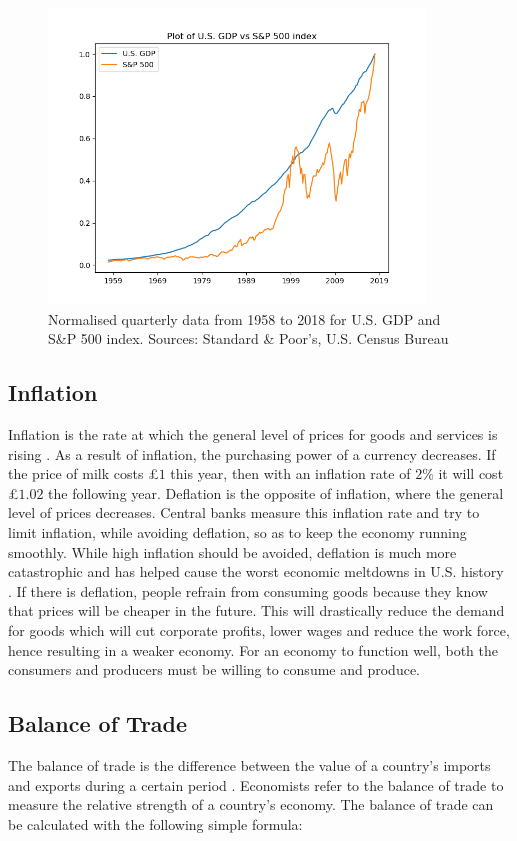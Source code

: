 \documentclass{UoYCSproject}
\begin{document}
\begin{figure}[h]
\includegraphics[width=10cm]{GDPvsSP500}
\centering
\caption{Normalised quarterly data from 1958 to 2018 for U.S. GDP and S\&P 500 index. Sources: Standard \& Poor's, U.S. Census Bureau} 
\label{fig:gdpvssp500}
\end{figure}

\subsection{Inflation}
Inflation is the rate at which the general level of prices for goods and services is rising \cite{inflation}. As a result of inflation, the purchasing power of a currency decreases. If the price of milk costs \pounds $1$ this year, then with an inflation rate of $2$\% it will cost \pounds $1.02$ the following year. Deflation is the opposite of inflation, where the general level of prices decreases. Central banks measure this inflation rate and try to limit inflation, while avoiding deflation, so as to keep the economy running smoothly. While high inflation should be avoided, deflation is much more catastrophic and has helped cause the worst economic meltdowns in U.S. history \cite{fleckenstein2013deflation}. If there is deflation, people refrain from consuming goods because they know that prices will be cheaper in the future. This will drastically reduce the demand for goods which will cut corporate profits, lower wages and reduce the work force, hence resulting in a weaker economy. For an economy to function well, both the consumers and producers must be willing to consume and produce. 

\subsection{Balance of Trade}
The balance of trade is the difference between the value of a country's imports and exports during a certain period \cite{balanceoftrade}. Economists refer to the balance of trade to measure the relative strength of a country's economy. The balance of trade can be calculated with the following simple formula:
\end{document}
